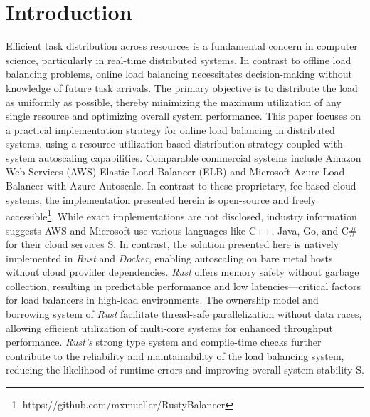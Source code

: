 \documentclass[twocolumn]{webofc}
\begin{document}
\section{Introduction}
Efficient task distribution across resources is a fundamental concern in computer science, particularly in real-time distributed systems. In contrast to offline load balancing problems, online load balancing necessitates decision-making without knowledge of future task arrivals. The primary objective is to distribute the load as uniformly as possible, thereby minimizing the maximum utilization of any single resource and optimizing overall system performance.
This paper focuses on a practical implementation strategy for online load balancing in distributed systems, using a resource utilization-based distribution strategy coupled with system autoscaling capabilities. Comparable commercial systems include Amazon Web Services (AWS) Elastic Load Balancer (ELB) and Microsoft Azure Load Balancer with Azure Autoscale. In contrast to these proprietary, fee-based cloud systems, the implementation presented herein is open-source and freely accessible\footnote{https://github.com/mxmueller/RustyBalancer}. While exact implementations are not disclosed, industry information suggests AWS and Microsoft use various languages like C++, Java, Go, and C# for their cloud services {\color{red}S}.
In contrast, the solution presented here is natively implemented in \textit{Rust} and \textit{Docker}, enabling autoscaling on bare metal hosts without cloud provider dependencies. \textit{Rust} offers memory safety without garbage collection, resulting in predictable performance and low latencies—critical factors for load balancers in high-load environments. The ownership model and borrowing system of \textit{Rust} facilitate thread-safe parallelization without data races, allowing efficient utilization of multi-core systems for enhanced throughput performance. \textit{Rust's} strong type system and compile-time checks further contribute to the reliability and maintainability of the load balancing system, reducing the likelihood of runtime errors and improving overall system stability {\color{red}S}.
\end{document}
